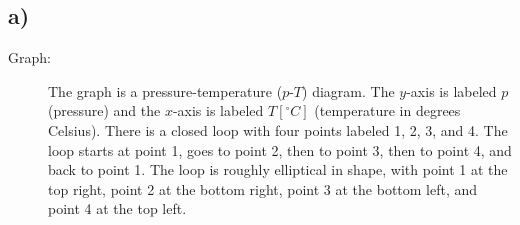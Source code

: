 

\subsection*{a)}

\begin{description}
    \item[Graph:] The graph is a pressure-temperature ($p$-$T$) diagram. The $y$-axis is labeled $p$ (pressure) and the $x$-axis is labeled $T [^\circ C]$ (temperature in degrees Celsius). There is a closed loop with four points labeled 1, 2, 3, and 4. The loop starts at point 1, goes to point 2, then to point 3, then to point 4, and back to point 1. The loop is roughly elliptical in shape, with point 1 at the top right, point 2 at the bottom right, point 3 at the bottom left, and point 4 at the top left.
\end{description}